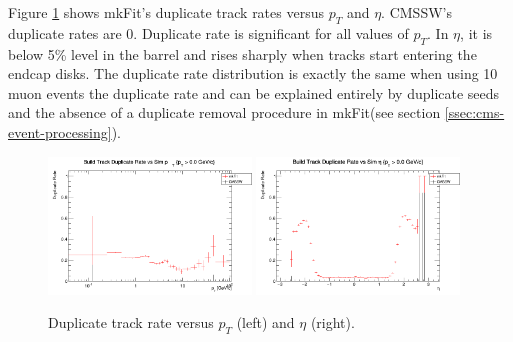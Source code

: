 \documentclass{webofc}
\def\mkfit{mkFit\xspace}
\def\twop{0.48\textwidth}
\def\postfigskip{\vskip-4mm}
\begin{document}
Figure \ref{fig:drates} shows \mkfit's duplicate track rates versus $p_T$ and
$\eta$. CMSSW's duplicate rates are 0. Duplicate rate is significant for all
values of $p_T$. In $\eta$, it is below 5\% level in the barrel and rises
sharply when tracks start entering the endcap disks. The duplicate rate 
distribution is exactly the same when using 10 muon events the duplicate rate 
and can be explained entirely by duplicate seeds and the absence of a duplicate
 removal procedure in \mkfit (see section \ref{ssec:cms-event-processing}).

\begin{figure}[thb]
  \centering
  \includegraphics[width=\twop]{figs/phys/SKL-SP_CMSSW_TTbar_PU70_dr_pt_logx_build_pt0p0_SIMVAL.png}
  \hfill
  \includegraphics[width=\twop]{figs/phys/SKL-SP_CMSSW_TTbar_PU70_dr_eta_build_pt0p0_SIMVAL.png}
  \postfigskip

  \caption{Duplicate track rate versus $p_T$ (left) and $\eta$ (right).}
  \label{fig:drates}
\end{figure}
\end{document}
